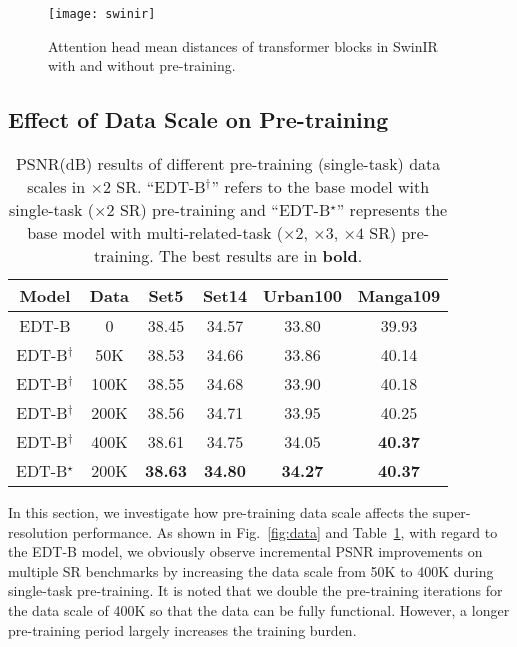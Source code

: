 \documentclass[runningheads]{llncs}
\begin{document}
	\begin{figure}[t]
		\begin{center}
			\texttt{[image: swinir]}
		\end{center}
		\vspace{-0.2in}
		\caption{Attention head mean distances of transformer blocks in SwinIR~\cite{liang2021swinir} with and without pre-training.}
		\label{fig:swinir}
		\vspace{-0.15in}
	\end{figure}
	


	\subsection{Effect of Data Scale on Pre-training}
	\label{sec:scale}
	


	
	\begin{table}[t]
		\caption{PSNR(dB) results of different pre-training (single-task) data scales in $\times 2$ SR. ``EDT-B$^\dagger$'' refers to the base model with single-task ($\times 2$ SR) pre-training and ``EDT-B$^\star$'' represents the base model with multi-related-task ($\times 2$, $\times 3$, $\times 4$ SR) pre-training. The best results are in \textbf{bold}.}
\setlength\tabcolsep{5pt}
		\begin{center}
\begin{tabular}{| c | c | c  c  c  c |}
				\hline
				Model & Data & Set5 & Set14 & Urban100 & Manga109 \\
				\hline
				EDT-B & 0 & 38.45 & 34.57 & 33.80 & 39.93 \\
				EDT-B$^\dagger$ & 50K & 38.53 & 34.66 & 33.86 & 40.14 \\
				EDT-B$^\dagger$ & 100K & 38.55 & 34.68 & 33.90 & 40.18  \\
				EDT-B$^\dagger$ & 200K & 38.56 & 34.71 & 33.95 & 40.25 \\
				EDT-B$^\dagger$ & 400K & 38.61 & 34.75 & 34.05 & \textbf{40.37} \\			
				\hline
				EDT-B$^\star$ & 200K & \textbf{38.63} & \textbf{34.80} & \textbf{34.27} & \textbf{40.37} \\
				\hline
			\end{tabular}
\end{center}
\vspace{-0.1in}
		\label{tab:data}
	\end{table} 
	
In this section, we investigate how pre-training data scale affects the super-resolution performance. As shown in Fig.~\ref{fig:data} and Table~\ref{tab:data}, with regard to the EDT-B model, we obviously observe incremental PSNR improvements on multiple SR benchmarks by increasing the data scale from 50K to 400K during single-task pre-training. It is noted that we double the pre-training iterations for the data scale of 400K so that the data can be fully functional. However, a longer pre-training period largely increases the training burden. 
\end{document}
